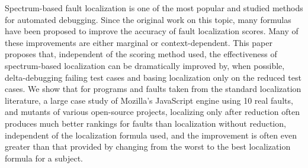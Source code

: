 Spectrum-based fault localization is one of the most popular and studied methods for automated debugging. Since the original work on this topic, many formulas have been proposed to improve the accuracy of fault localization scores. Many of these improvements are either marginal or context-dependent.  This paper proposes that, independent of the scoring method used, the effectiveness of spectrum-based localization can be dramatically improved by, when possible, delta-debugging failing test cases and basing localization only on the reduced test cases. We show that for programs and faults taken from the standard localization literature, a large case study of Mozilla's JavaScript engine using 10 real faults, and mutants of various open-source projects, localizing only after reduction often produces much better rankings for faults than localization without reduction, independent of the localization formula used, and the improvement is often even greater than that provided by changing from the worst to the best localization formula for a subject.